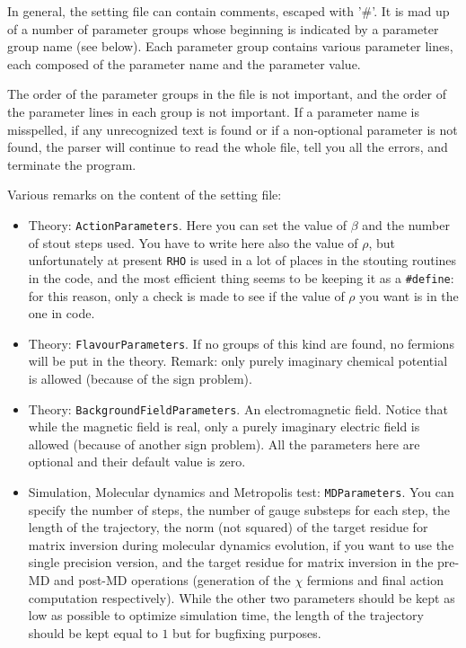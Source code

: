 In general, the setting file can contain comments, escaped with '\#'. It is mad 
up of a number of parameter groups whose beginning is indicated by a parameter 
group name (see below). Each parameter group contains various parameter lines, 
each composed of the parameter name and the parameter value.

The order of the parameter groups in the file is not important, and the order 
of the parameter lines in each group is not important. If a parameter name is 
misspelled, if any unrecognized text is found or if a non-optional parameter 
is not found, the parser will continue to read the whole file, tell you all 
the errors, and terminate the program.

Various remarks on the content of the setting file:

\begin{itemize}
    \item{Theory: \verb|ActionParameters|.}
        Here you can set the value of $\beta$ and the number of stout steps used. You 
        have to write here also the value of $\rho$, but unfortunately at present 
        \verb|RHO| is used in a lot of places in the stouting routines in the code, and 
        the most efficient thing seems to be keeping it as a \verb|#define|: for this 
        reason, only a check is made to see if the value of $\rho$ you want is in 
        the one in code.
    \item{Theory: \verb|FlavourParameters|.}
        If no groups of this kind are found, no fermions will be put in the theory.
        Remark: only purely imaginary chemical potential is allowed (because of the 
        sign problem). 
    \item{Theory: \verb|BackgroundFieldParameters|.}
        An electromagnetic field. Notice that while the magnetic field is real, only 
        a purely imaginary electric field is allowed (because of another sign 
problem). All the parameters here are optional and their default value is zero.
    \item{Simulation, Molecular dynamics and Metropolis test: \verb|MDParameters|.} You can specify the number of steps, 
        the number of gauge substeps for each step, the length of the 
        trajectory, the norm (not squared) of the target residue for matrix 
        inversion during molecular dynamics evolution, if you want to use 
        the single precision version, and the target residue for matrix 
inversion in the pre-MD and post-MD operations (generation of the $\chi$ 
fermions and final action computation respectively). While the other two 
parameters should be kept as  
        low as possible to optimize simulation time, the length of the trajectory 
        should be kept equal to $1$ but for bugfixing purposes.


\end{itemize}
